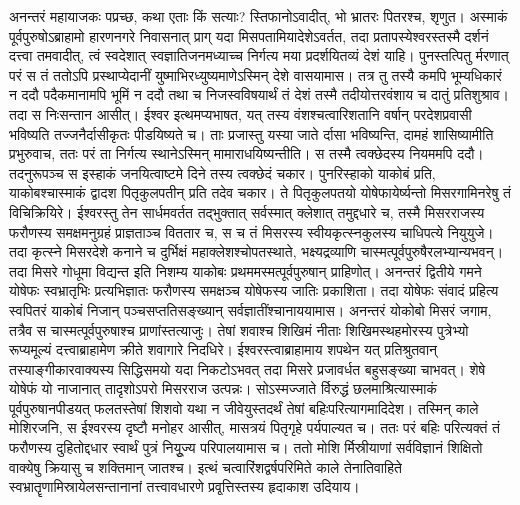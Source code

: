 \adhyAya
{}
\vakya अनन्तरं महायाजकः पप्रच्छ, कथा एताः किं सत्याः?
\vakya स्तिफानोऽवादीत्, भो भ्रातरः पितरश्च, शृणुत। अस्माकं पूर्वपुरुषोऽब्राहामो हारणनगरे निवासनात् प्राग् यदा मिसपतामियादेशेऽवर्तत, तदा प्रतापस्येश्वरस्तस्मै दर्शनं दत्त्वा तमवादीत्,
\vakya त्वं स्वदेशात् स्वज्ञातिजनमध्याच्च निर्गत्य मया प्रदर्शयितव्यं देशं याहि।
\vakya पुनस्तत्पितु र्मरणात् परं स तं ततोऽपि प्रस्थाप्येदानीं युष्माभिरध्युष्यमाणेऽस्मिन् देशे वासयामास।
\vakya तत्र तु तस्यै कमपि भूम्यधिकारं न ददौ पदैकमानामपि भूमिं न ददौ तथा च निजस्वविषयार्थं तं देशं तस्मै तदीयोत्तरवंशाय च दातुं प्रतिशुश्राव। तदा स निःसन्तान आसीत्।
\vakya ईश्वर इत्थमप्यभाषत, यत् तस्य वंशश्चत्वारिशतानि वर्षान् परदेशप्रवासी भविष्यति तज्जनैर्दासीकृतः पीडयिष्यते च।
\vakya ताः प्रजास्तु यस्या जाते र्दासा भविष्यन्ति, दामहं शासिष्यामीति प्रभुरुवाच, ततः परं ता निर्गत्य स्थानेऽस्मिन् मामाराधयिष्यन्तीति।
\vakya स तस्मै त्वक्छेदस्य नियममपि ददौ। तदनुरूपञ्च स इस्हाकं जनयित्वाष्टमे दिने तस्य त्वक्छेदं चकार।
\vakya पुनरिस्हाको याकोबं प्रति, याकोबश्चास्माकं द्वादश पितृकुलपतीन् प्रति तदेव चकार।
\vakya ते पितृकुलपतयो योषेफायेर्ष्यन्तो मिसरगामिनरेषु तं विचिक्रियिरे।
\vakya ईश्वरस्तु तेन सार्धमवर्तत तद्भुक्तात् सर्वस्मात् क्लेशात् तमुद्दधारे च, तस्मै मिसरराजस्य फरौणस्य समक्षमनुग्रहं प्राज्ञताञ्च विततार च, स च तं मिसरस्य स्वीयकृत्स्नकुलस्य चाधिपत्ये नियुयुजे।
\vakya तदा कृत्स्ने मिसरदेशे कनाने च दुर्भिक्षं महाक्लेशश्चोपतस्थाते, भक्ष्यद्रव्याणि चास्मत्पूर्वपुरुषैरलभ्यान्यभवन्।
\vakya तदा मिसरे गोधूमा विद्यन्त इति निशम्य याकोबः प्रथममस्मत्पूर्वपुरुषान् प्राहिणोत्।
\vakya अनन्तरं द्वितीये गमने योषेफः स्वभ्रातृभिः प्रत्यभिज्ञातः फरौणस्य समक्षञ्च योषेफस्य जातिः प्रकाशिता।
\vakya तदा योषेफः संवादं प्रहित्य स्वपितरं याकोबं निजान् पञ्चसप्ततिसङ्ख्यान् सर्वज्ञातींश्चानाययामास।
\vakya अनन्तरं योकोबो मिसरं जगाम, तत्रैव स चास्मत्पूर्वपुरुषाश्च प्राणांस्तत्याजुः।
\vakya तेषां शवाश्च शिखिमं नीताः शिखिमस्थहमोरस्य पुत्रेभ्यो रूप्यमूल्यं दत्त्वाब्राहामेण क्रीते शवागारे निदधिरे।
\vakya ईश्वरस्त्वाब्राहामाय शपथेन यत् प्रतिश्रुतवान् तस्याङ्गीकारवाक्यस्य सिद्धिसमयो यदा निकटोऽभवत् तदा मिसरे प्रजावर्धत बहुसङ्ख्या चाभवत्।
\vakya शेषे योषेफं यो नाजानात् तादृशोऽपरो मिसरराज उत्पन्नः।
\vakya सोऽस्मज्जाते र्विरुद्धं छलमाश्रित्यास्माकं पूर्वपुरुषानपीडयत् फलतस्तेषां शिशवो यथा न जीवेयुस्तदर्थं तेषां बहिःपरित्यागमादिदेश।
\vakya तस्मिन् काले मोशिरजनि, स ईश्वरस्य दृष्टौ मनोहर आसीत्, मासत्रयं पितृगृहे पर्यपाल्यत च।
\vakya ततः परं बहिः परित्यक्तं तं फरौणस्य दुहितोद्दधार स्वार्थं पुत्रं नियूुज्य परिपालयामास च।
\vakya ततो मोशि र्मिस्रीयाणां सर्वविज्ञानं शिक्षितो वाक्येषु क्रियासु च शक्तिमान् जातश्च।
\vakya इत्थं चत्वारिंशद्वर्षपरिमिते काले तेनातिवाहिते स्वभ्रातॄणामिस्रायेलसन्तानानां तत्त्वावधारणे प्रवृ्त्तिस्तस्य हृदाकाश उदियाय।
